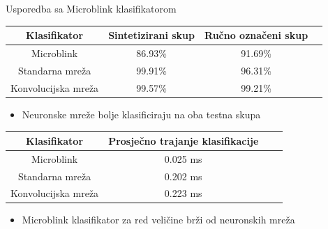 \documentclass[pdf]{beamer}
\begin{document}
\begin{frame}{Usporedba sa Microblink klasifikatorom}

\begin{table}
\begin{center}
\centering
    \begin{tabular}{ | c| c| c|c |}
    \hline    		
    Klasifikator & Sintetizirani skup  & Ručno označeni skup \\ \hline
    Microblink  & 86.93\% & 91.69\%  \\ \hline
    Standarna mreža & 99.91\% & 96.31\%  \\ \hline
    Konvolucijska mreža & 99.57\% &  99.21\% \\
    \hline
    \end{tabular}
\end{center}
\end{table}

\begin{itemize}
\setlength\itemsep{0.5em}
	\item Neuronske mreže bolje klasificiraju na oba testna skupa
\end{itemize}

\begin{table}
\begin{center}
\centering
    \begin{tabular}{ | c| c| c|c |}
    \hline    		
    Klasifikator & Prosječno trajanje klasifikacije \\ \hline
    Microblink & 0.025 ms \\ \hline
    Standarna mreža & 0.202 ms  \\ \hline
    Konvolucijska mreža &  0.223 ms \\
    \hline
    \end{tabular} 
\end{center}
\end{table}

\begin{itemize}
\setlength\itemsep{0.5em}
	\item Microblink klasifikator za red veličine brži od neuronskih mreža
\end{itemize}

\end{frame}
\end{document}
